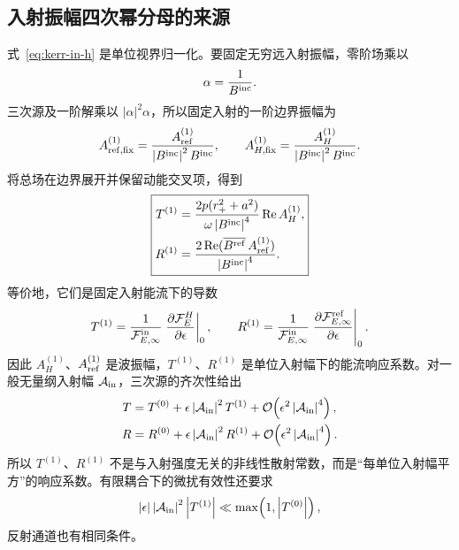 \documentclass[UTF8,fontset=fandol,11pt,a4paper,oneside]{ctexart}
\numberwithin{equation}{section}
\newcommand{\cO}{\mathcal O}
\newcommand{\cF}{\mathcal F}
\newcommand{\rp}{r_+}
\newcommand{\Bin}{B^{\rm inc}}
\newcommand{\Bref}{B^{\rm ref}}
\newcommand{\Aref}{A_{\rm ref}^{(1)}}
\newcommand{\AH}{A_H^{(1)}}
\newcommand{\abs}[1]{\left|#1\right|}
\newcommand{\Ree}{\operatorname{Re}}
\begin{document}
\subsection{入射振幅四次幂分母的来源}

式~\eqref{eq:kerr-in-h} 是单位视界归一化。要固定无穷远入射振幅，零阶场乘以
\begin{equation}
\alpha=\frac{1}{\Bin}.
\end{equation}
三次源及一阶解乘以 $\abs\alpha^2\alpha$，所以固定入射的一阶边界振幅为
\begin{equation}
A_{{\rm ref},{\rm fix}}^{(1)}
=\frac{\Aref}{\abs{\Bin}^2\Bin},\qquad
A_{H,{\rm fix}}^{(1)}
=\frac{\AH}{\abs{\Bin}^2\Bin}.
\label{eq:kerr-fixed-amplitudes}
\end{equation}
将总场在边界展开并保留动能交叉项，得到
\begin{equation}
\boxed{\begin{aligned}
T^{(1)}
&=\frac{2p(\rp^2+a^2)}{\omega\abs{\Bin}^4}
\Ree\AH,\\
R^{(1)}
&=\frac{2\Ree(\overline{\Bref}\,\Aref)}
{\abs{\Bin}^4}.
\end{aligned}}
\label{eq:kerr-T1R1}
\end{equation}
等价地，它们是固定入射能流下的导数
\begin{equation}
T^{(1)}=\frac{1}{\cF_{E,\infty}^{\rm in}}
\left.\frac{\partial\cF_E^H}{\partial\epsilon}\right|_{0},
\qquad
R^{(1)}=\frac{1}{\cF_{E,\infty}^{\rm in}}
\left.\frac{\partial\cF_{E,\infty}^{\rm ref}}
{\partial\epsilon}\right|_{0}.
\label{eq:kerr-flux-derivative}
\end{equation}
因此 $A_H^{(1)}$、$A_{\rm ref}^{(1)}$ 是波振幅，$T^{(1)}$、$R^{(1)}$ 是单位入射幅下的能流响应系数。对一般无量纲入射幅 $\mathcal A_{\rm in}$，三次源的齐次性给出
\begin{align}
T&=T^{(0)}+\epsilon\abs{\mathcal A_{\rm in}}^2T^{(1)}
+\cO\!\left(\epsilon^2\abs{\mathcal A_{\rm in}}^4\right),\nonumber\\
R&=R^{(0)}+\epsilon\abs{\mathcal A_{\rm in}}^2R^{(1)}
+\cO\!\left(\epsilon^2\abs{\mathcal A_{\rm in}}^4\right).
\label{eq:incident-amplitude-scaling}
\end{align}
所以 $T^{(1)}$、$R^{(1)}$ 不是与入射强度无关的非线性散射常数，而是“每单位入射幅平方”的响应系数。有限耦合下的微扰有效性还要求
\begin{equation}
\abs{\epsilon}\abs{\mathcal A_{\rm in}}^2\abs{T^{(1)}}
\ll \max\!\left(1,\abs{T^{(0)}}\right),
\label{eq:flux-perturbative-control}
\end{equation}
反射通道也有相同条件。
\end{document}
